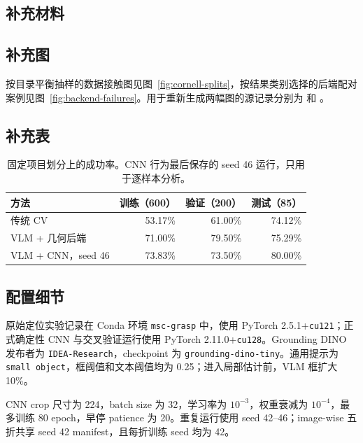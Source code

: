 \documentclass{l4proj}
\begin{document}
\begin{appendices}

\chapter{补充材料}

\section{补充图}
按目录平衡抽样的数据接触图见图~\ref{fig:cornell-splits}，按结果类别选择的后端配对案例见图~\ref{fig:backend-failures}。用于重新生成两幅图的源记录分别为  和 。

\section{补充表}
\begin{table}[htbp]
  \centering
  \caption{固定项目划分上的成功率。CNN 行为最后保存的 seed 46 运行，只用于逐样本分析。}
  \label{tab:split-success}
  \begin{tabular}{lrrr}
    \toprule
    方法 & 训练（600） & 验证（200） & 测试（85） \\
    \midrule
    传统 CV & 53.17\% & 61.00\% & 74.12\% \\
    VLM + 几何后端 & 71.00\% & 79.50\% & 75.29\% \\
    VLM + CNN，seed 46 & 73.83\% & 73.50\% & 80.00\% \\
    \bottomrule
  \end{tabular}
\end{table}

\section{配置细节}
原始定位实验记录在 Conda 环境 \texttt{msc-grasp} 中，使用 PyTorch 2.5.1+\texttt{cu121}；正式确定性 CNN 与交叉验证运行使用 PyTorch 2.11.0+\texttt{cu128}。Grounding DINO 发布者为 \texttt{IDEA-Research}，checkpoint 为 \texttt{grounding-dino-tiny}。通用提示为 \texttt{small object}，框阈值和文本阈值均为 0.25；进入局部估计前，VLM 框扩大 10\%。

CNN crop 尺寸为 224，batch size 为 32，学习率为 $10^{-3}$，权重衰减为 $10^{-4}$，最多训练 80 epoch，早停 patience 为 20。重复运行使用 seed 42--46；image-wise 五折共享 seed 42 manifest，且每折训练 seed 均为 42。


\end{appendices}
\end{document}
